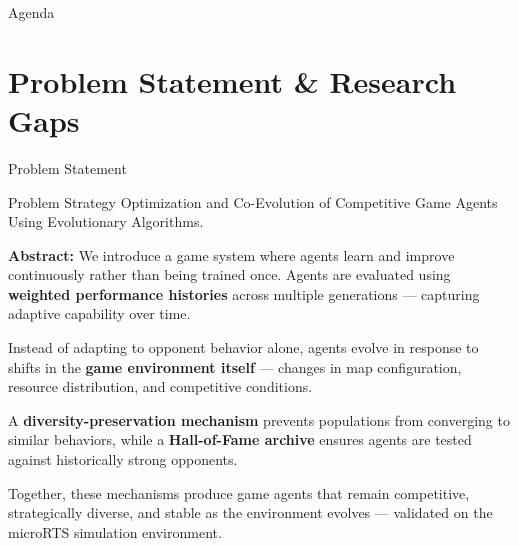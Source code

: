 \documentclass[aspectratio=169, 11pt]{beamer}
\begin{document}




\begin{frame}{Agenda}\tableofcontents\end{frame}




\section{Problem Statement \& Research Gaps}

\begin{frame}{Problem Statement}
\begin{block}{Problem}
Strategy Optimization and Co-Evolution of Competitive Game Agents Using Evolutionary Algorithms.
\end{block}
\vspace{0.15cm}
\small
\textbf{Abstract:} We introduce a game system where agents learn and improve continuously rather than being trained once. Agents are evaluated using \textbf{weighted performance histories} across multiple generations --- capturing adaptive capability over time.

\vspace{0.15cm}
Instead of adapting to opponent behavior alone, agents evolve in response to shifts in the \textbf{game environment itself} --- changes in map configuration, resource distribution, and competitive conditions.

\vspace{0.15cm}
A \textbf{diversity-preservation mechanism} prevents populations from converging to similar behaviors, while a \textbf{Hall-of-Fame archive} ensures agents are tested against historically strong opponents.

\vspace{0.15cm}
Together, these mechanisms produce game agents that remain competitive, strategically diverse, and stable as the environment evolves --- validated on the microRTS simulation environment.
\end{frame}
\end{document}
